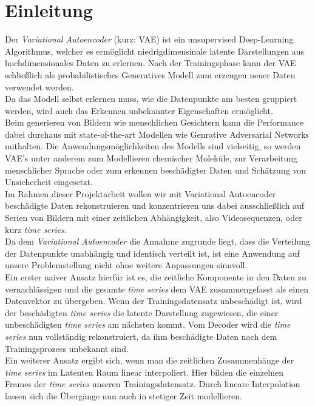 \documentclass[12pt]{article}
\begin{document}
	\tableofcontents
	\newpage
	\section[Einleitung]{Einleitung}
	Der \emph{Variational Autoencoder} (kurz: VAE) ist ein unsupervised Deep-Learning Algorithmus, welcher es ermöglicht niedrigdimensinale latente Darstellungen aus hochdimensionales Daten zu erlernen. Nach der Trainingsphase kann der VAE schließlich als probabilistisches Generatives Modell zum erzeugen neuer Daten verwendet werden.\\
	Da das Modell selbst erlernen muss,
	wie die Datenpunkte am besten gruppiert werden, wird auch das Erkennen unbekannter Eigenschaften ermöglicht.\\
	Beim generieren von Bildern wie menschlichen Gesichtern kann die Performance dabei durchaus mit state-of-the-art Modellen wie Genrative Adversarial Networks mithalten. Die Anwendungsmöglichkeiten des Modells sind vielseitig, so werden VAE's unter anderem zum Modellieren chemischer Moleküle, zur Verarbeitung menschlicher Sprache oder zum erkennen beschädigter Daten und Schätzung von Unsicherheit eingesetzt.\\
	Im Rahmen dieser Projektarbeit wollen wir mit Variational Autoencoder beschädigte Daten rekonstruieren und konzentrieren uns dabei ausschließlich auf Serien von Bildern mit einer zeitlichen Abhängigkeit, also Videosequenzen, oder kurz \emph{time series}. \\
	Da dem \emph{Variational Autoencoder} die Annahme zugrunde liegt, dass die Verteilung der Datenpunkte
	unabhängig und identisch verteilt ist, ist eine Anwendung auf unsere Problemstellung nicht ohne weitere
	Anpassungen sinnvoll.\\
	Ein erster naiver Ansatz hierfür ist es, die zeitliche Komponente in den Daten zu
	vernachlässigen und die gesamte \emph{time series} dem VAE zusammengefasst als einen Datenvektor zu übergeben. Wenn der Trainingsdatensatz unbeschädigt ist, wird der beschädigten \emph{time series} die latente Darstellung zugewiesen, die einer unbeschädigten \emph{time series} am nächsten kommt. Vom Decoder wird die \emph{time series} nun vollständig rekonstruiert, da ihm beschädigte Daten nach dem Trainingsprozess unbekannt sind.\\
	Ein weiterer Ansatz ergibt sich, wenn man die zeitlichen Zusammenhänge der \emph{time series}
	im Latenten Raum linear interpoliert. Hier bilden die einzelnen Frames der \emph{time series} unseren Trainingsdatensatz. Durch lineare Interpolation lassen sich die Übergänge nun auch in stetiger Zeit modellieren. \\
\end{document}
